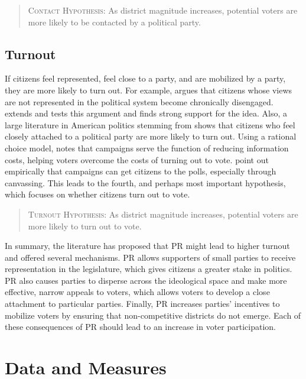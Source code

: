 \documentclass[12pt]{article}
\begin{document}
\begin{quote}
        \textsc{Contact Hypothesis:} As district magnitude increases, potential voters are more likely to be contacted by a political party.
\end{quote}

\subsection*{Turnout}

If citizens feel represented, feel close to a party, and are mobilized by a party, they are more likely to turn out. For example, \cite{Schattschneider1960} argues that citizens whose views are not represented in the political system become chronically disengaged. \cite{Solt2008, Solt2010} extends and tests this argument and finds strong support for the idea. Also, a large literature in American politics stemming from \cite{Campbelletal1960} shows that citizens who feel closely attached to a political party are more likely to turn out. Using a rational choice model, \cite{Downs1957} notes that campaigns serve the function of reducing information costs, helping voters overcome the costs of turning out to vote. \cite{GerberGreen2000} point out empirically that campaigns can get citizens to the polls, especially through canvassing. This leads to the fourth, and perhaps most important hypothesis, which focuses on whether citizens turn out to vote.

\begin{quote}
\textsc{Turnout Hypothesis:} As district magnitude increases, potential voters are more likely to turn out to vote.
\end{quote}

In summary, the literature has proposed that PR might lead to higher turnout and offered several mechanisms. PR allows supporters of small parties to receive representation in the legislature, which gives citizens a greater stake in politics. PR also causes parties to disperse across the ideological space and make more effective, narrow appeals to voters, which allows voters to develop a close attachment to particular parties. Finally, PR increases parties' incentives to mobilize voters by ensuring that non-competitive districts do not emerge. Each of these consequences of PR should lead to an increase in voter participation.

\section*{Data and Measures}
\end{document}
